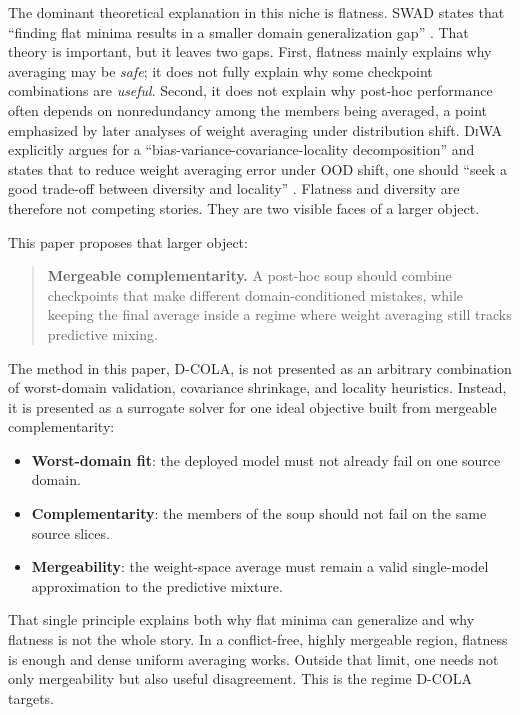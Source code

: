 \documentclass{article}
\theoremstyle{definition}
\newcommand{\dcola}{\textup{\textsc{D-COLA}}}
\newcommand{\swad}{\textup{\textsc{SWAD}}}
\newcommand{\diwa}{\textup{\textsc{DiWA}}}
\newcommand{\ood}{\textup{\textsc{OOD}}}
\begin{document}
The dominant theoretical explanation in this niche is flatness. \swad{} states that ``finding flat minima results in a smaller domain generalization gap'' \citep{cha2021swad}. That theory is important, but it leaves two gaps. First, flatness mainly explains why averaging may be \emph{safe}; it does not fully explain why some checkpoint combinations are \emph{useful}. Second, it does not explain why post-hoc performance often depends on nonredundancy among the members being averaged, a point emphasized by later analyses of weight averaging under distribution shift. \diwa{} explicitly argues for a ``bias-variance-covariance-locality decomposition'' and states that to reduce weight averaging error under \ood{} shift, one should ``seek a good trade-off between diversity and locality'' \citep{rame2022diwa}. Flatness and diversity are therefore not competing stories. They are two visible faces of a larger object.

This paper proposes that larger object:
\begin{quote}
\textbf{Mergeable complementarity.} A post-hoc soup should combine checkpoints that make different domain-conditioned mistakes, while keeping the final average inside a regime where weight averaging still tracks predictive mixing.
\end{quote}

The method in this paper, \dcola{}, is not presented as an arbitrary combination of worst-domain validation, covariance shrinkage, and locality heuristics. Instead, it is presented as a surrogate solver for one ideal objective built from mergeable complementarity:
\begin{itemize}[leftmargin=1.3em]
    \item \textbf{Worst-domain fit}: the deployed model must not already fail on one source domain.
    \item \textbf{Complementarity}: the members of the soup should not fail on the same source slices.
    \item \textbf{Mergeability}: the weight-space average must remain a valid single-model approximation to the predictive mixture.
\end{itemize}

That single principle explains both why flat minima can generalize and why flatness is not the whole story. In a conflict-free, highly mergeable region, flatness is enough and dense uniform averaging works. Outside that limit, one needs not only mergeability but also useful disagreement. This is the regime \dcola{} targets.
\end{document}
